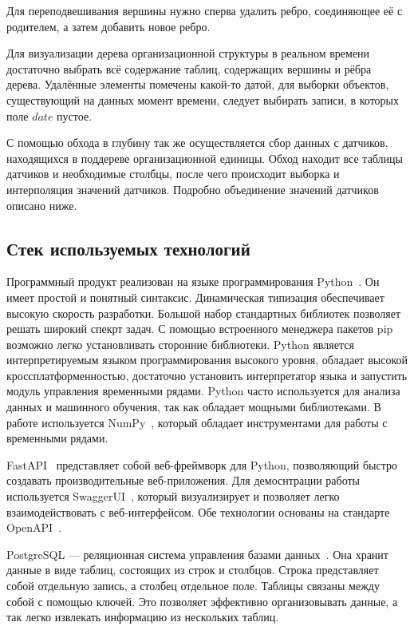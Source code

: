 Для переподвешивания вершины нужно сперва удалить ребро, соединяющее её с родителем, а затем добавить новое ребро.

Для визуализации дерева организационной структуры в реальном времени достаточно выбрать всё содержание таблиц, содержащих вершины и рёбра дерева. Удалённые элементы помечены какой-то датой, для выборки объектов, существующий на данных момент времени, следует выбирать записи, в которых поле $date$ пустое.

С помощью обхода в глубину так же осуществляется сбор данных с датчиков, находящихся в поддереве организационной единицы. Обход находит все таблицы датчиков и необходимые столбцы, после чего происходит выборка и интерполяция значений датчиков. Подробно объединение значений датчиков описано ниже.

\subsection{Стек используемых технологий}

Программный продукт реализован на языке программирования Python~\cite{Python}. Он имеет простой и понятный синтаксис. Динамическая типизация обеспечивает высокую скорость разработки. Большой набор стандартных библиотек позволяет решать широкий спекрт задач. С помощью встроенного менеджера пакетов pip возможно легко установливать сторонние библиотеки. Python является интерпретируемым языком программирования высокого уровня, обладает высокой кроссплатформенностью, достаточно установить интерпретатор языка и запустить модуль управления временными рядами. Python часто используется для анализа данных и машинного обучения, так как обладает мощными библиотеками. В работе используется NumPy~\cite{numpy}, который обладает инструментами для работы с временными рядами.

FastAPI~\cite{FastAPI} представляет собой веб-фреймворк для Python, позволяющий быстро создавать производительные веб-приложения. Для демоснтрации работы используется SwaggerUI~\cite{swaggerui}, который визуализирует и позволяет легко взаимодействовать с веб-интерфейсом. Обе технологии основаны на стандарте OpenAPI~\cite{OpenAPI}.

PostgreSQL --- реляционная система управления базами данных~\cite{postgresql}. Она хранит данные в виде таблиц, состоящих из строк и столбцов. Строка представляет собой отдельную запись, а столбец отдельное поле. Таблицы связаны между собой с помощью ключей. Это позволяет эффективно организовывать данные, а так легко извлекать информацию из нескольких таблиц.

